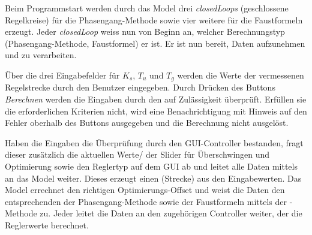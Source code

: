Beim   Programmstart   werden   durch  das   Model   drei   \emph{closedLoops}
(geschlossene  Regelkreise) f\"ur  die Phasengang-Methode  sowie vier  weitere
f\"ur die  Faustformeln erzeugt. Jeder \emph{closedLoop} weiss  nun von Beginn
an, welcher  Berechnungstyp (Phasengang-Methode,  Faustformel) er  ist. Er ist
nun bereit, Daten aufzunehmen und zu verarbeiten.

\"Uber  die  drei  Eingabefelder  f\"ur  $K_s$, $T_u$  und  $T_g$  werden  die
Werte  der  vermessenen  Regelstrecke  durch  den  Benutzer  eingegeben. Durch
Dr\"ucken  des   Buttons  \emph{Berechnen}  werden  die   Eingaben  durch  den
  auf  Zul\"assigkeit  \"uberpr\"uft. Erf\"ullen  sie  die
erforderlichen Kriterien nicht, wird eine Benachrichtigung mit Hinweis auf den
Fehler oberhalb des Buttons ausgegeben und die Berechnung nicht ausgel\"ost.

Haben  die Eingaben  die \"Uberpr\"ufung  durch den  GUI-Controller bestanden,
fragt   dieser   zus\"atzlich   die   aktuellen  Werte/   der   Slider   f\"ur
\"Uberschwingen  und  Optimierung sowie  den  Reglertyp  auf  dem GUI  ab  und
leitet  alle  Daten  mittels    an  das  Model  weiter. Dieses
erzeugt einen  (Strecke) aus den Eingabewerten. Das Model errechnet
den  richtigen  Optimierungs-Offset und  weist  die  Daten den  entsprechenden
 der  Phasengang-Methode sowie der Faustformeln  mittels der
-Methode zu. Jeder   leitet die Daten  an den
zugeh\"origen Controller weiter, der die Reglerwerte berechnet.
